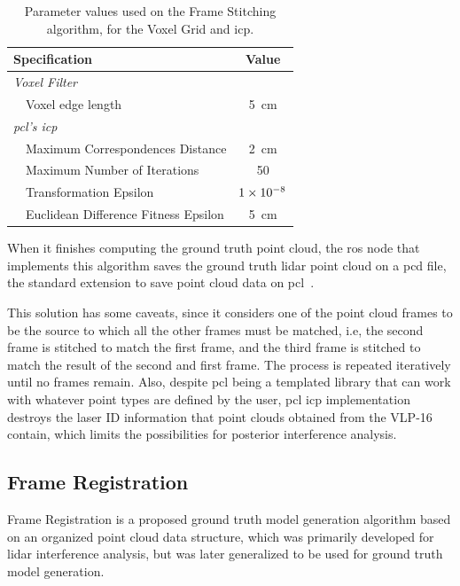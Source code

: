 \begin{table}[!ht]
\centering
\renewcommand{\arraystretch}{1.2}
\begin{tabular}{@{}lp{8cm}c@{}}
	\toprule
	\multicolumn{2}{l}{Specification} & Value \\
		\midrule
	\multicolumn{2}{l}{\textit{Voxel Filter}} & \\ 
	\phantom{ab} & Voxel edge length & \SI{5}{\centi\meter} \\ 
	\midrule
	\multicolumn{2}{l}{\textit{\ac{pcl}'s \ac{icp}}} &  \\ 
	\phantom{ab} & Maximum Correspondences Distance & \SI{2}{\centi\meter} \\
							 & Maximum Number of Iterations & 50 \\
							 & Transformation Epsilon & $1\times 10^{-8}$ \\
							 & Euclidean Difference Fitness Epsilon & \SI{5}{\centi\meter} \\
	\bottomrule
\end{tabular}
\caption[Parameters used on the Frame Stitching algorithm, for the ground-truth model generation.]{Parameter values used on the Frame Stitching algorithm, for the Voxel Grid and \ac{icp}.}
\label{tab:frame-stitching-parameters}
\end{table}

When it finishes computing the ground truth point cloud, the \ac{ros} node that implements this algorithm saves the ground truth \ac{lidar} point cloud on a \ac{pcd} file, the standard extension to save point cloud data on \ac{pcl}~\cite{PCL}.

This solution has some caveats, since it considers one of the point cloud frames to be the source to which all the other frames must be matched, i.e, the second frame is stitched to match the first frame, and the third frame is stitched to match the result of the second and first frame. The process is repeated iteratively until no frames remain. Also, despite \ac{pcl} being a templated library that can work with whatever point types are defined by the user, \ac{pcl} \ac{icp} implementation destroys the laser ID information that point clouds obtained from the VLP-16 contain, which limits the possibilities for posterior interference analysis. 


\subsection{Frame Registration}
\label{subsec:lidar-interference:frame-registration}
Frame Registration is a proposed ground truth model generation algorithm based on an organized point cloud data structure, which was primarily developed for \ac{lidar} interference analysis, but was later generalized to be used for ground truth model generation.

